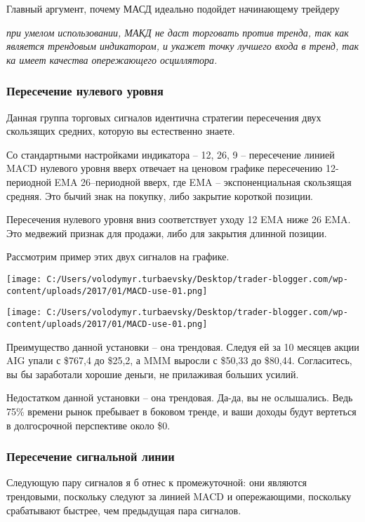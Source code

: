 \documentclass[a5paper]{article}
\begin{document}
Главный аргумент, почему МАСД идеально подойдет начинающему трейдеру

        \emph{при умелом использовании, МАКД не даст торговать против тренда, так как является трендовым индикатором, и укажет точку лучшего входа в тренд, так ка имеет качества опережающего осциллятора.}

\subsubsection{Пересечение нулевого уровня}

Данная группа торговых сигналов идентична стратегии пересечения двух скользящих средних, которую вы естественно знаете.

Со стандартными настройками индикатора – 12, 26, 9 – пересечение линией MACD нулевого уровня вверх отвечает на ценовом графике пересечению 12-периодной EMA 26–периодной вверх, где EMA – экспоненциальная скользящая средняя. Это бычий знак на покупку, либо закрытие короткой позиции.

Пересечения нулевого уровня вниз соответствует уходу 12 EMA ниже 26 EMA. Это медвежий признак для продажи, либо для закрытия длинной позиции.

Рассмотрим пример этих двух сигналов на графике.

\texttt{[image: C:/Users/volodymyr.turbaevsky/Desktop/trader-blogger.com/wp-content/uploads/2017/01/MACD-use-01.png]}

\texttt{[image: C:/Users/volodymyr.turbaevsky/Desktop/trader-blogger.com/wp-content/uploads/2017/01/MACD-use-01.png]}

Преимущество данной установки – она трендовая. Следуя ей за 10 месяцев акции AIG упали с \$767,4 до \$25,2, а MMM выросли с \$50,33 до \$80,44. Согласитесь, вы бы заработали хорошие деньги, не прилаживая больших усилий.

Недостатком данной установки – она трендовая. Да-да, вы не
ослышались. Ведь 75\% времени рынок пребывает в боковом тренде, и ваши
доходы будут вертеться в долгосрочной перспективе около \$0.

\subsubsection{Пересечение сигнальной линии}

Следующую пару сигналов я б отнес к промежуточной: они являются трендовыми, поскольку следуют за линией MACD и опережающими, поскольку срабатывают быстрее, чем предыдущая пара сигналов.
\end{document}

